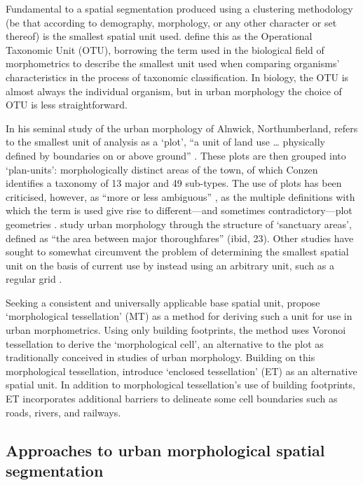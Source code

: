 \documentclass[a4paper, nobind]{templates/ociamthesis}
\begin{document}
Fundamental to a spatial segmentation produced using a clustering methodology (be that according to demography, morphology, or any other character or set thereof) is the smallest spatial unit used. \citet{dibble2015} define this as the Operational Taxonomic Unit (OTU), borrowing the term used in the biological field of morphometrics to describe the smallest unit used when comparing organisms' characteristics in the process of taxonomic classification. In biology, the OTU is almost always the individual organism, but in urban morphology the choice of OTU is less straightforward.

In his seminal study of the urban morphology of Alnwick, Northumberland, \citet{conzen1960} refers to the smallest unit of analysis as a `plot', ``a unit of land use \ldots{} physically defined by boundaries on or above ground'' \citep[5]{conzen1960}. These plots are then grouped into `plan-units': morphologically distinct areas of the town, of which Conzen identifies a taxonomy of 13 major and 49 sub-types. The use of plots has been criticised, however, as ``more or less ambiguous'' \citep[1]{kropf1997plot}, as the multiple definitions with which the term is used give rise to different---and sometimes contradictory---plot geometries \citep{kropf2018}. \citet{mehaffy2010} study urban morphology through the structure of `sanctuary areas', defined as ``the area between major thoroughfares'' (ibid, 23). Other studies have sought to somewhat circumvent the problem of determining the smallest spatial unit on the basis of current use by instead using an arbitrary unit, such as a regular grid \citep{jochem2021, mercadéaloy2018, rode2014}.

Seeking a consistent and universally applicable base spatial unit, \citet{fleischmann2020tessellation} propose `morphological tessellation' (MT) as a method for deriving such a unit for use in urban morphometrics. Using only building footprints, the method uses Voronoi tessellation to derive the `morphological cell', an alternative to the plot as traditionally conceived in studies of urban morphology. Building on this morphological tessellation, \citet{dab_mf_2021} introduce `enclosed tessellation' (ET) as an alternative spatial unit. In addition to morphological tessellation's use of building footprints, ET incorporates additional barriers to delineate some cell boundaries such as roads, rivers, and railways.

\hypertarget{approaches-to-urban-morphological-spatial-segmentation}{%
\subsection{Approaches to urban morphological spatial segmentation}\label{approaches-to-urban-morphological-spatial-segmentation}}
\end{document}
